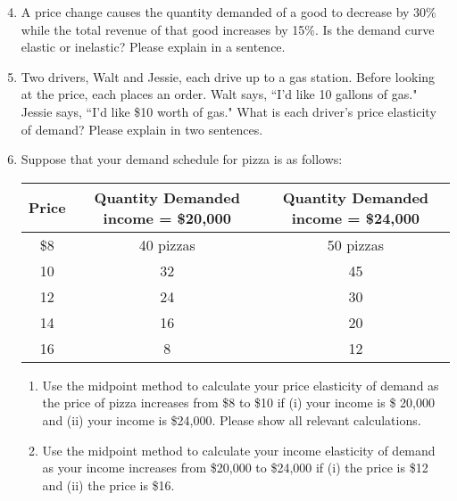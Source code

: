 \documentclass{article}
\begin{document}
\begin{enumerate}
\setcounter{enumi}{3}

\item A price change causes the quantity demanded of a good to decrease by 30\% while the total revenue of that good increases by 15\%. Is the demand curve elastic or inelastic? Please explain in a sentence. 

\item Two drivers, Walt and Jessie, each drive up to a gas station. Before looking at the price, each places an order. Walt says, ``I'd like 10 gallons of gas." Jessie says, ``I'd like \$10 worth of gas." What is each driver's price elasticity of demand? Please explain in two sentences.
	
\item Suppose that your demand schedule for pizza is as follows:

	\begin{center}
	\begin{tabular}{c | c | c}
	\textbf{Price} & \makecell{\textbf{Quantity Demanded} \\ \textbf{income = \$20,000}} & \makecell{\textbf{Quantity Demanded} \\ \textbf{income = \$24,000}} \\
	\hline
	\$8 & 40 pizzas & 50 pizzas \\
	10 & 32 & 45 \\
	12 & 24 & 30 \\
	14 & 16 & 20 \\
	16 & 8 & 12
	\end{tabular}
	\end{center}
	
	\begin{enumerate}
	
	\item Use the midpoint method to calculate your price elasticity of demand as the price of pizza increases from \$8 to \$10 if (i) your income is \$ 20,000 and (ii) your income is \$24,000. Please show all relevant calculations.
	
	\item Use the midpoint method to calculate your income elasticity of demand as your income increases from \$20,000 to \$24,000 if (i) the price is \$12 and (ii) the price is \$16.
	
	\end{enumerate}
	

\end{enumerate}
\end{document}
